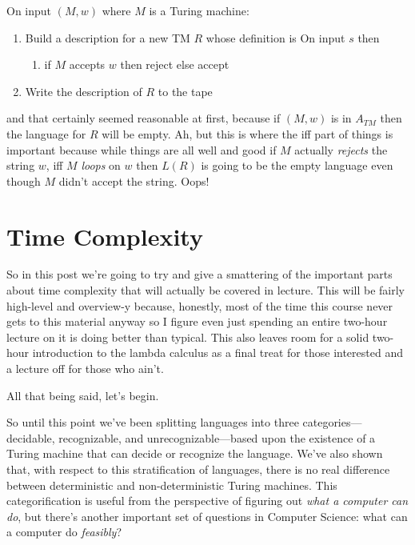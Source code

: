 \documentclass[11pt]{article}
\begin{document}
On input $(M,w)$ where $M$ is a Turing machine: 
\begin{enumerate}
\item Build a description for a new TM $R$ whose definition is
On input $s$ then 
\begin{enumerate}
\item if $M$ accepts $w$ then reject else accept
\end{enumerate}
\item Write the description of $R$ to the tape
\end{enumerate}

and that certainly seemed reasonable at first, because if $(M,w)$ is in $A_{TM}$ then the language for $R$ will be empty. Ah, but this is where the iff part of things is important because while things are all well and good if $M$ actually \emph{rejects} the string $w$, iff $M$ \emph{loops} on $w$ then $L(R)$ is going to be the empty language even though $M$ didn't accept the string. Oops! 
\section{Time Complexity}
\label{sec-16}
So in this post we're going to try and give a smattering of the important parts about time complexity that will actually be covered in lecture. This will be fairly high-level and overview-y because, honestly, most of the time this course never gets to this material anyway so I figure even just spending an entire two-hour lecture on it is doing better than typical. This also leaves room for a solid two-hour introduction to the lambda calculus as a final treat for those interested and a lecture off for those who ain't.

All that being said, let's begin.

So until this point we've been splitting languages into three categories--- decidable, recognizable, and unrecognizable---based upon the existence of a Turing machine that can decide or recognize the language. We've also shown that, with respect to this stratification of languages, there is no real difference between deterministic and non-deterministic Turing machines. This categorification is useful from the perspective of figuring out \emph{what a computer can do}, but there's another important set of questions in Computer Science: what can a computer do \emph{feasibly}? 
\end{document}
